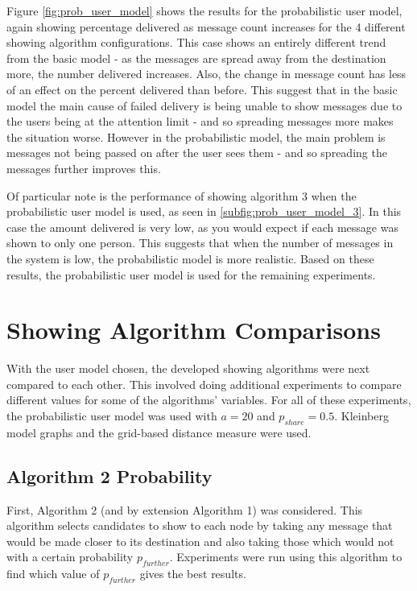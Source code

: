 \documentclass[bsc,frontabs,twoside,singlespacing,parskip,deptreport]{infthesis}     %
\begin{document}
Figure \ref{fig:prob_user_model} shows the results for the probabilistic user model, again showing percentage delivered as message count increases for the 4 different showing algorithm configurations. This case shows an entirely different trend from the basic model - as the messages are spread away from the destination more, the number delivered increases. Also, the change in message count has less of an effect on the percent delivered than before. This suggest that in the basic model the main cause of failed delivery is being unable to show messages due to the users being at the attention limit - and so spreading messages more makes the situation worse. However in the probabilistic model, the main problem is messages not being passed on after the user sees them - and so spreading the messages further improves this.

Of particular note is the performance of showing algorithm 3 when the probabilistic user model is used, as seen in \ref{subfig:prob_user_model_3}. In this case the amount delivered is very low, as you would expect if each message was shown to only one person. This suggests that when the number of messages in the system is low, the probabilistic model is more realistic. Based on these results, the probabilistic user model is used for the remaining experiments.

\section{Showing Algorithm Comparisons}

With the user model chosen, the developed showing algorithms were next compared to each other. This involved doing additional experiments to compare different values for some of the algorithms' variables. For all of these experiments, the probabilistic user model was used with $a = 20$ and $p_{share} = 0.5$. Kleinberg model graphs and the grid-based distance measure were used.

\subsection{Algorithm 2 Probability} \label{subsec:algorithm_2_prob}
First, Algorithm 2 (and by extension Algorithm 1) was considered. This algorithm selects candidates to show to each node by taking any message that would be made closer to its destination and also taking those which would not with a certain probability $p_{further}$. Experiments were run using this algorithm to find which value of $p_{further}$ gives the best results.
\end{document}
